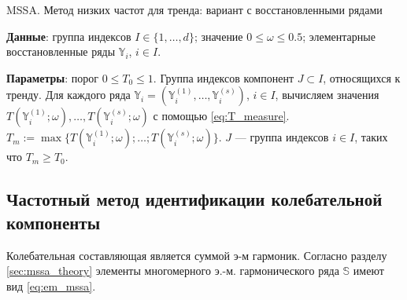 \documentclass[specialist,
               substylefile = spbu.rtx,
               subf,href,colorlinks=true, 12pt]{disser}
\newtheorem{remark}{Замечание}
\begin{document}
\begin{algorithm}[!hhh]
\caption{MSSA. Метод низких частот для тренда: вариант с восстановленными рядами}
\label{alg:freqmssa_3}
\begin{algorithmic}[1]
\REQUIRE
\item \textbf{Данные}: группа индексов $I \in \{1,\ldots,d\}$; значение  $0 \leqslant  \omega \leqslant 0.5$; элементарные восстановленные ряды $\mathbb{Y}_{i}$, $i \in I$.
\item \textbf{Параметры}: порог $0 \leqslant T_0 \leqslant 1$.
\ENSURE Группа индексов компонент $J \subset I$, относящихся к тренду.
\STATE  Для каждого ряда $\mathbb{Y}_{i} = (\mathbb{Y}_i^{(1)}, \ldots, \mathbb{Y}_i^{(s)})$, $i \in I$, вычисляем значения $T(\mathbb{Y}_i^{(1)}; \omega), \ldots,
T(\mathbb{Y}_i^{(s)}; \omega)$ с помощью  \eqref{eq:T_measure}. $T_m := \max \{T(\mathbb{Y}_i^{(1)}; \omega); \ldots;
T(\mathbb{Y}_i^{(s)}; \omega)\}$.
\STATE $J$ --- группа индексов $i \in I$, таких что $T_m \geqslant T_0$.
\end{algorithmic}
\end{algorithm}

\newpage
\subsection{Частотный метод идентификации колебательной компоненты}
Колебательная составляющая является суммой э-м гармоник.
Согласно разделу \ref{sec:mssa_theory} элементы многомерного э.-м. гармонического ряда $\mathbb{S}$ имеют вид \eqref{eq:em_mssa}.

%
%
%
\end{document}
